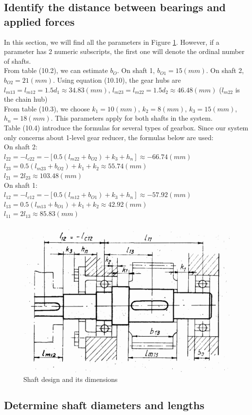 \subsection{Identify the distance between bearings and applied forces}
In this section, we will find all the parameters in Figure \ref{shaft}. However, if a parameter has 2 numeric subscripts, the first one will denote the ordinal number of shafts.\\
From table (10.2), we can estimate $ b_O $. On shaft 1, $ b_{O1} = 15\unit{(mm)} $. On shaft 2, $ b_{O2} = 21\unit{(mm)} $. Using equation (10.10), the gear hubs are $ l_{m13} = l_{m12} = 1.5d_1 \approx  34.83\unit{(mm)} $, $ l_{m23} = l_{m22} = 1.5d_2 \approx 46.48\unit{(mm)} $ ($ l_{m22} $ is the chain hub)\\
From table (10.3), we choose $ k_1=10\unit{(mm)}$, $ k_2=8\unit{(mm)} $, $ k_3=15\unit{(mm)} $, $ h_n=18\unit{(mm)} $. This parameters apply for both shafts in the system.\\
Table (10.4) introduce the formulas for several types of gearbox. Since our system only concerns about 1-level gear reducer, the formulas below are used:\\
On shaft 2:\\
$ l_{22} = -l_{c22} = -\left[ 0.5(l_{m22}+b_{O2})+k_3+h_n  \right] \approx -66.74\unit{(mm)} $\\
$ l_{23} = 0.5(l_{m23}+b_{O2})+k_1+k_2 \approx 55.74\unit{(mm)} $\\
$ l_{21} = 2l_{23} \approx 103.48\unit{(mm)}$\\
On shaft 1:\\
$ l_{12} = -l_{c12} = -\left[ 0.5(l_{m12}+b_{O1})+k_3+h_n  \right] \approx -57.92\unit{(mm)} $\\
$ l_{13} = 0.5(l_{m13}+b_{O1})+k_1+k_2 \approx 42.92\unit{(mm)} $\\
$ l_{11} = 2l_{13} \approx 85.83\unit{(mm)}$
\begin{figure}[ht]
	\centering
	\includegraphics[width=120mm]{shaft1.png}
	\caption{Shaft design and its dimensions}
	\label{shaft}
\end{figure}

\subsection{Determine shaft diameters and lengths}

